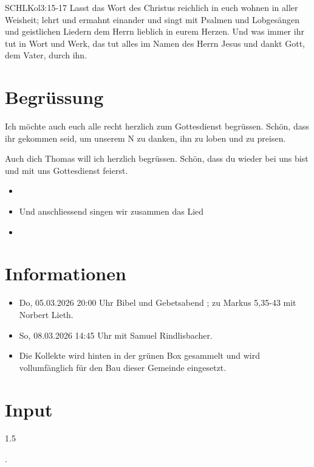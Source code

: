 \documentclass[fontsize=14pt]{mybib}
\newcommand{\Name}{Thomas}
\begin{document}
\begin{bibelbox}{SCHL}{Kol}{3:15-17}
    Lasst das Wort des Christus reichlich in euch wohnen in aller Weisheit; lehrt und ermahnt einander und singt mit Psalmen und Lobgesängen und geistlichen Liedern dem Herrn lieblich in eurem Herzen. Und was immer ihr tut in Wort und Werk, das tut alles im Namen des Herrn Jesus und dankt Gott, dem Vater, durch ihn.
\end{bibelbox}
\section{Begrüssung}
Ich möchte auch euch alle recht herzlich zum Gottesdienst begrüssen. Schön, dass ihr gekommen seid, um unserem \herr N zu danken, ihn zu loben und zu preisen.


Auch dich \Name{} will ich herzlich begrüssen. Schön, dass du wieder bei uns bist und mit uns Gottesdienst feierst.
\begin{itemize}
    \item[] \beten{}
    \item[] Und anschliessend singen wir zusammen das Lied
    \item[] 
\end{itemize}

\section{Informationen}
\begin{itemize}
    \item {} Do, 05.03.2026 20:00 Uhr Bibel und Gebetsabend ; zu Markus 5,35-43 mit Norbert Lieth.
    \item {} So, 08.03.2026 14:45 Uhr mit Samuel Rindlisbacher.
    \item {} Die Kollekte wird hinten in der grünen Box gesammelt und wird vollumfänglich für den Bau dieser Gemeinde eingesetzt.
\end{itemize}

\section{ Input }
\begin{spacing}{1.5}
    

    .
\end{spacing}
\end{document}
